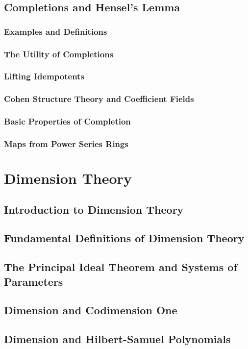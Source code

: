 \subsection{Completions and Hensel's Lemma}
\subsubsection{Examples and Definitions}
\subsubsection{The Utility of Completions}
\subsubsection{Lifting Idempotents}
\subsubsection{Cohen Structure Theory and Coefficient Fields}
\subsubsection{Basic Properties of Completion}
\subsubsection{Maps from Power Series Rings}

\section{Dimension Theory}

\subsection{Introduction to Dimension Theory}
\subsection{Fundamental Definitions of Dimension Theory}
\subsection{The Principal Ideal Theorem and Systems of Parameters}
\subsection{Dimension and Codimension One}
\subsection{Dimension and Hilbert-Samuel Polynomials}
